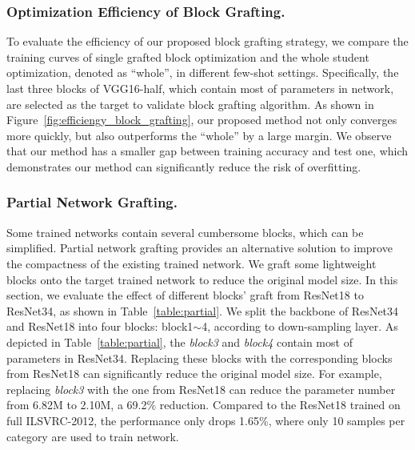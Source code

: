 \documentclass[letterpaper]{article} %
\begin{document}
{{        \subsubsection{Optimization Efficiency of Block Grafting.}
        {
            To evaluate the efficiency of our proposed block grafting strategy, we compare the training curves of single grafted block optimization and the whole student optimization, denoted as ``whole'', in different few-shot settings.
            Specifically, the last three blocks of VGG16-half, which contain most of parameters in network, are selected as the target to validate block grafting algorithm.
            As shown in Figure~\ref{fig:efficiengy_block_grafting}, our proposed method not only converges more quickly, but also outperforms the ``whole'' by a large margin.
            We observe that our method has a smaller gap between training accuracy and test one, which demonstrates our method can significantly reduce the risk of overfitting.

        }


        \subsubsection{Partial Network Grafting.}
        {
            Some trained networks contain several cumbersome blocks, which can be simplified.
            Partial network grafting provides an alternative solution to improve the compactness of the existing trained network.
            We graft some lightweight blocks onto the target trained network to reduce the original model size.
            In this section, we evaluate the effect of different blocks' graft from ResNet18 to ResNet34, as shown in Table~\ref{table:partial}.
            We split the backbone of ResNet34 and ResNet18 into four blocks: block1$\sim$4, according to down-sampling layer.
            As depicted in Table~\ref{table:partial}, the \emph{block3} and \emph{block4} contain most of parameters in ResNet34.
            Replacing these blocks with the corresponding blocks from ResNet18 can significantly reduce the original model size.
            For example, replacing \emph{block3} with the one from ResNet18 can reduce the parameter number from 6.82M to 2.10M, a 69.2\% reduction.
            Compared to the ResNet18 trained on full ILSVRC-2012, the performance only drops 1.65\%, where only 10 samples per category are used to train network.


}}}
\end{document}
